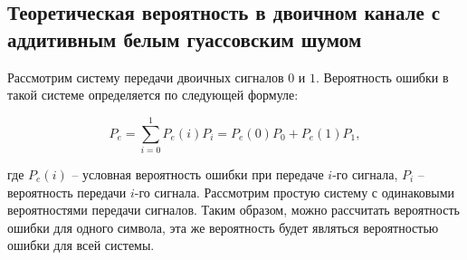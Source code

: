 \subsection{Теоретическая вероятность в двоичном канале с аддитивным белым гуассовским шумом}

Рассмотрим систему передачи двоичных сигналов $0$ и $1$. Вероятность ошибки в такой системе определяется по следующей формуле:

\begin{equation}
	P_e = \sum_{i=0}^{1}P_e(i)P_i = P_e(0)P_0 + P_e(1)P_1,
\end{equation}

где $P_e(i)$ -- условная вероятность ошибки при передаче $i$-го сигнала, $P_i$ -- вероятность передачи $i$-го сигнала. Рассмотрим простую систему с одинаковыми вероятностями передачи сигналов. Таким образом, можно рассчитать вероятность ошибки для одного символа, эта же вероятность будет являться вероятностью ошибки для всей системы.